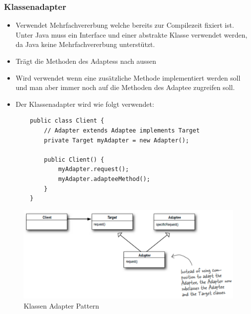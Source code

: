 \subsubsection{Klassenadapter}
\begin{itemize}
	\item Verwendet Mehrfachvererbung welche bereits zur Compilezeit fixiert ist. Unter Java muss ein Interface und einer abstrakte Klasse verwendet werden, da Java keine Mehrfachvererbung unterstützt.
	\item Trägt die Methoden des Adaptess nach aussen
	\item Wird verwendet wenn eine zusätzliche Methode implementiert werden soll und man aber immer noch auf die  Methoden des Adaptee zugreifen soll.
	\item Der Klassenadapter wird wie folgt verwendet: 
	\begin{lstlisting}
	public class Client {
		// Adapter extends Adaptee implements Target
		private Target myAdapter = new Adapter();
	
		public Client() {
			myAdapter.request();
			myAdapter.adapteeMethod();
		}
	}
	\end{lstlisting}
\end{itemize}
\begin{figure}[h]
	\centering
	\includegraphics[width=0.9\linewidth]{images/class_adapter_uml.pdf}
	\caption{Klassen Adapter Pattern}
\end{figure}

